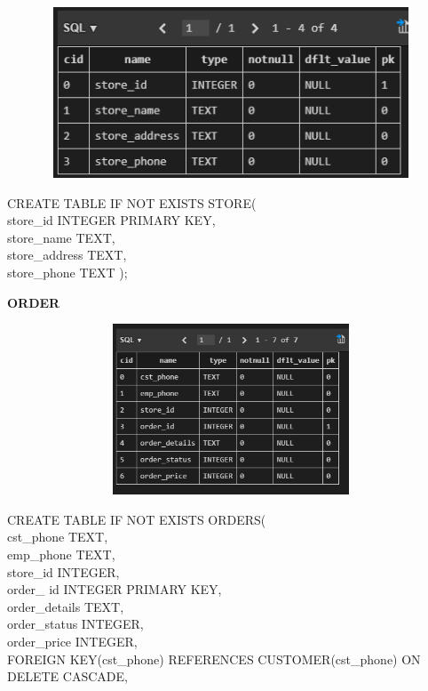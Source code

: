 \documentclass[12pt,a4paper]{report}
\begin{document}
\begin{figure}[hbtp]
\centering
\includegraphics[width=5in,height=2in]{../fig/store}\\
\end{figure}
CREATE TABLE IF NOT EXISTS STORE(\\
 store\_id INTEGER PRIMARY KEY,\\
 store\_name TEXT,\\
 store\_address TEXT,\\
 store\_phone TEXT );\\
\begin{flushleft}
\textbf{ORDER}\\
\end{flushleft}
\begin{figure}[hbtp]
\centering
\includegraphics[width=5in,height=2in]{../fig/orders}\\
\end{figure}
CREATE TABLE IF NOT EXISTS ORDERS(\\
cst\_phone TEXT,\\
emp\_phone TEXT,\\
store\_id INTEGER,\\
order\_ id INTEGER PRIMARY KEY, \\
order\_details TEXT,\\
order\_status INTEGER,\\
order\_price INTEGER,\\
FOREIGN KEY(cst\_phone) REFERENCES CUSTOMER(cst\_phone) ON DELETE CASCADE,\\
\end{document}
